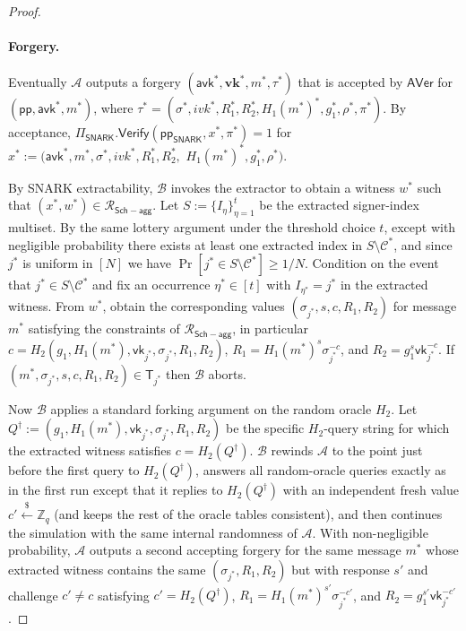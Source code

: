 \documentclass{article}
\newcommand{\ppSNARK}[0]{\mathsf{pp}_{\mathsf{SNARK}}}
\newcommand{\pp}[0]{\mathsf{pp}}
\newcommand{\vk}[0]{\mathsf{vk}}
\newcommand{\avk}[0]{\mathsf{avk}}
\newcommand{\getsr}{\xleftarrow{\$}}
\begin{document}
\begin{proof}
\paragraph{Forgery.}
Eventually $\mathcal{A}$ outputs a forgery $(\avk^\ast,\mathbf{vk}^\ast,m^\ast,\tau^\ast)$ that is accepted by $\mathsf{AVer}$ for $(\pp,\avk^\ast,m^\ast)$, where
\(\tau^\ast=(\sigma^\ast,ivk^\ast,R_1^\ast,R_2^\ast,H_1(m^\ast)^\ast,g_1^\ast,\rho^\ast,\pi^\ast).\)
By acceptance, $\Pi_{\mathsf{SNARK}}.\mathsf{Verify}(\ppSNARK,x^\ast,\pi^\ast)=1$ for
\(x^\ast:=(\avk^\ast,m^\ast,\sigma^\ast,ivk^\ast,R_1^\ast,R_2^\ast,\)
\(H_1(m^\ast)^\ast,g_1^\ast,\rho^\ast).\)

By SNARK extractability, $\mathcal{B}$ invokes the extractor to obtain a witness $w^\ast$ such that $(x^\ast,w^\ast)\in\mathcal{R}_{\mathsf{Sch-agg}}$. Let $S:=\{I_\eta\}_{\eta=1}^{t}$ be the extracted signer-index multiset. By the same lottery argument under the threshold choice $t$, except with negligible probability there exists at least one extracted index in $S\setminus \mathcal{C}^\ast$, and since $j^\ast$ is uniform in $[N]$ we have $\Pr[j^\ast\in S\setminus \mathcal{C}^\ast]\ge 1/N$. Condition on the event that $j^\ast\in S\setminus \mathcal{C}^\ast$ and fix an occurrence $\eta^\ast\in[t]$ with $I_{\eta^\ast}=j^\ast$ in the extracted witness. From $w^\ast$, obtain the corresponding values $(\sigma_{j^\ast},s,c,R_1,R_2)$ for message $m^\ast$ satisfying the constraints of $\mathcal{R}_{\mathsf{Sch-agg}}$, in particular $c=H_2(g_1,H_1(m^\ast),\vk_{j^\ast},\sigma_{j^\ast},R_1,R_2)$, $R_1=H_1(m^\ast)^{s}\sigma_{j^\ast}^{-c}$, and $R_2=g_1^{s}\vk_{j^\ast}^{-c}$. If $(m^\ast,\sigma_{j^\ast},s,c,R_1,R_2)\in \mathsf{T}_{j^\ast}$ then $\mathcal{B}$ aborts.

Now $\mathcal{B}$ applies a standard forking argument on the random oracle $H_2$. Let $Q^\dagger := (g_1,H_1(m^\ast),\vk_{j^\ast},\sigma_{j^\ast},R_1,R_2)$ be the specific $H_2$-query string for which the extracted witness satisfies $c=H_2(Q^\dagger)$. $\mathcal{B}$ rewinds $\mathcal{A}$ to the point just before the first query to $H_2(Q^\dagger)$, answers all random-oracle queries exactly as in the first run except that it replies to $H_2(Q^\dagger)$ with an independent fresh value $c'\getsr\mathbb{Z}_q$ (and keeps the rest of the oracle tables consistent), and then continues the simulation with the same internal randomness of $\mathcal{A}$. With non-negligible probability, $\mathcal{A}$ outputs a second accepting forgery for the same message $m^\ast$ whose extracted witness contains the same $(\sigma_{j^\ast},R_1,R_2)$ but with response $s'$ and challenge $c'\neq c$ satisfying $c'=H_2(Q^\dagger)$, $R_1=H_1(m^\ast)^{s'}\sigma_{j^\ast}^{-c'}$, and $R_2=g_1^{s'}\vk_{j^\ast}^{-c'}$.


\end{proof}
\end{document}
